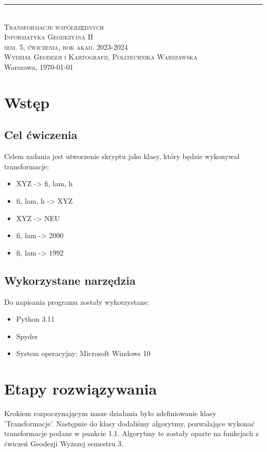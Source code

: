 \documentclass[10pt,a4paper]{article}
\newcommand{\titeReport}{Transformacje współrzędnych} %
\newcommand{\titleLecture}{Informatyka Geodezyjna II \\ sem. 5, ćwiczenia, rok akad. 2023-2024}
\newcommand{\faculty}{Wydział Geodezji i Kartografii}
\newcommand{\university}{Politechnika Warszawska}
\newcommand{\city}{Warszawa}
\begin{document}
	\begin{center} 
		\rule{\textwidth}{.5pt} \\
		\vspace{1.0cm}
		\Large \textsc{\titeReport}
		\vspace{0.5cm} \\  
		\large \textsc{\titleLecture}
		\vspace{0.5cm}\\
		\textsc{\faculty}, \textsc{\university}  \\ 
		\city, \today
	\end{center}

\tableofcontents
\newpage
\section{Wstęp}
\subsection{Cel ćwiczenia}
Celem zadania jest utworzenie skryptu jako klasy, który będzie wykonywał transformacje:
\begin{itemize}

	\item XYZ -> fi, lam, h
	\item fi, lam, h -> XYZ
	\item XYZ -> NEU
	\item fi, lam -> 2000
	\item fi, lam -> 1992
\end{itemize}
\subsection{Wykorzystane narzędzia}
Do napisania programu zostały wykorzystane:
\begin{itemize}
	\item Python 3.11
	\item Spyder 
	\item System operacyjny: Microsoft Windows 10
\end{itemize}
\section{Etapy rozwiązywania}
Krokiem rozpoczynającym nasze działania było zdefiniowanie klasy 'Transformacje'. Następnie do klasy dodaliśmy algorytmy, pozwalające wykonać transformacje podane w punkcie 1.1. Algorytmy te zostały oparte na funkcjach z ćwiczeń Geodezji Wyższej  semestru 3.
\vspace{0.5 cm}
\end{document}
